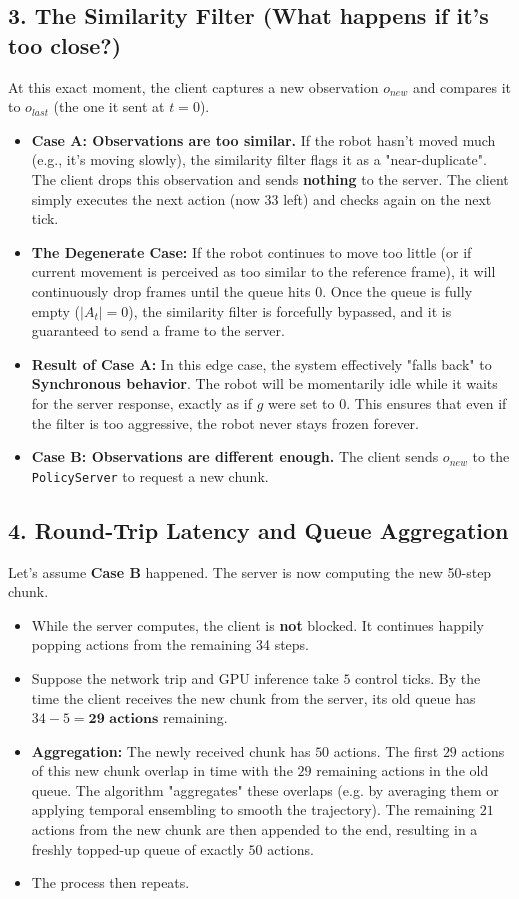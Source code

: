 \documentclass[11pt,a4paper]{article}
\begin{document}
\subsection{3. The Similarity Filter (What happens if it's too close?)}
At this exact moment, the client captures a new observation $o_{new}$ and compares it to $o_{last}$ (the one it sent at $t=0$).
\begin{itemize}
    \item \textbf{Case A: Observations are too similar.} If the robot hasn't moved much (e.g., it's moving slowly), the similarity filter flags it as a "near-duplicate". The client drops this observation and sends \textbf{nothing} to the server. The client simply executes the next action (now 33 left) and checks again on the next tick. 
    
    \item \textbf{The Degenerate Case:} If the robot continues to move too little (or if current movement is perceived as too similar to the reference frame), it will continuously drop frames until the queue hits $0$. Once the queue is fully empty ($|A_t| = 0$), the similarity filter is forcefully bypassed, and it is guaranteed to send a frame to the server. 
    
    \item \textbf{Result of Case A:} In this edge case, the system effectively "falls back" to \textbf{Synchronous behavior}. The robot will be momentarily idle while it waits for the server response, exactly as if $g$ were set to $0$. This ensures that even if the filter is too aggressive, the robot never stays frozen forever.
    \item \textbf{Case B: Observations are different enough.} The client sends $o_{new}$ to the \texttt{PolicyServer} to request a new chunk.
\end{itemize}

\subsection{4. Round-Trip Latency and Queue Aggregation}
Let's assume \textbf{Case B} happened. The server is now computing the new 50-step chunk. 
\begin{itemize}
    \item While the server computes, the client is \textbf{not} blocked. It continues happily popping actions from the remaining 34 steps.
    \item Suppose the network trip and GPU inference take $5$ control ticks. By the time the client receives the new chunk from the server, its old queue has $34 - 5 = \textbf{29 actions}$ remaining.
    \item \textbf{Aggregation:} The newly received chunk has $50$ actions. The first $29$ actions of this new chunk overlap in time with the $29$ remaining actions in the old queue. The algorithm "aggregates" these overlaps (e.g. by averaging them or applying temporal ensembling to smooth the trajectory). The remaining $21$ actions from the new chunk are then appended to the end, resulting in a freshly topped-up queue of exactly $50$ actions.
    \item The process then repeats.
\end{itemize}
\end{document}
